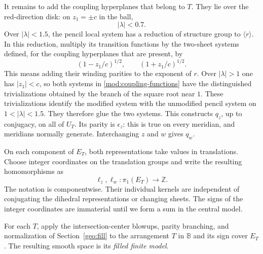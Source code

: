 \documentclass[11pt,reqno]{amsart}
\numberwithin{equation}{section}
\theoremstyle{definition}
\theoremstyle{remark}
\begin{document}
It remains to add the coupling hyperplanes that belong to $T$.
They lie over the red-direction disk: on $z_1=\pm c$ in the ball,
\[
 |\lambda|<0.7.
\]
Over $|\lambda|<1.5$, the pencil local system has a reduction of
structure group to $\langle r\rangle$.  In this reduction, multiply
its transition functions by the two-sheet systems defined, for the
coupling hyperplanes that are present, by
\begin{equation}\label{mod:coupling-functions}
 (1-z_1/c)^{1/2},\qquad (1+z_1/c)^{1/2}.
\end{equation}
This means adding their winding parities to the exponent of $r$.
Over $|\lambda|>1$ one has $|z_1|<c$, so both systems in
\eqref{mod:coupling-functions} have the distinguished trivializations
obtained by the branch of the square root near $1$.  These
trivializations identify the modified system with the unmodified
pencil system on $1<|\lambda|<1.5$.  They therefore glue the two
systems.  This constructs $q_z$, up to conjugacy, on all of $U_T$.
Its parity is $\epsilon_z$: this is true on every meridian, and
meridians normally generate.  Interchanging $z$ and $w$ gives $q_w$.

On each component of $E_T$, both representations take values in
translations.  Choose integer coordinates on the translation groups
and write the resulting homomorphisms as
\[
 \ell_z,\ell_w:\pi_1(E_T)\longrightarrow\mathbb Z.
\]
The notation is componentwise.  Their individual kernels are
independent of conjugating the dihedral representations or changing
sheets.  The signs of the integer coordinates are immaterial until
we form a sum in the central model.

For each $T$, apply the intersection-center blowups, parity branching,
and normalization of Section~\ref{geo:fill} to the arrangement $T$ in
$\mathbb B$ and its sign cover $E_T$.  The resulting smooth space is its
\emph{filled finite model}.
\end{document}
